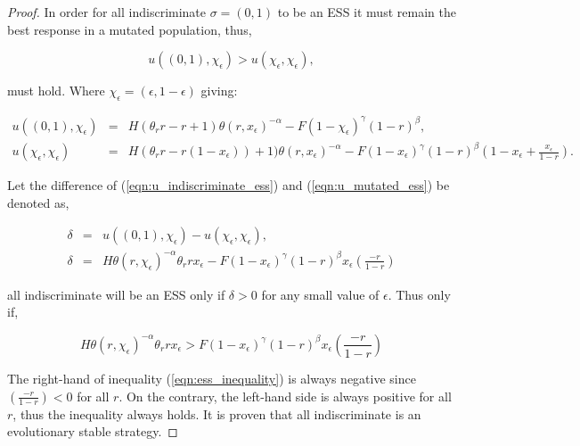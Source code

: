 \documentclass[10pt]{article}
\begin{document}
\begin{proof}
    In order for all indiscriminate \(\sigma=(0,1)\) to be an ESS it must
    remain the best response in a mutated population, thus,

    \begin{equation}\label{eqn:evolutionary_stability}
        u((0, 1), \chi_\epsilon) > u(\chi_\epsilon, \chi_\epsilon),
    \end{equation}

    must hold. Where \(\chi_{\epsilon}=(\epsilon, 1 - \epsilon)\) giving:

    \begin{eqnarray}
        \label{eqn:u_indiscriminate_ess}
        u((0, 1), \chi_\epsilon)  &=& H(\theta_rr - r + 1)\theta(r, x_\epsilon) ^{-\alpha}
        - F(1 - \chi_\epsilon) ^ {\gamma} (1- r) ^ {\beta},
        \\
        \label{eqn:u_mutated_ess}
        u(\chi_\epsilon, \chi_\epsilon) &=& H(\theta_rr - r(1 - x_\epsilon))+ 1)\theta(r,
        x_\epsilon) ^{-\alpha} - F(1 - x_\epsilon) ^ {\gamma} (1- r) ^
        {\beta}\left(1 - 
        x_\epsilon + \frac{x_\epsilon}{1- r}\right).
\end{eqnarray}

    Let the difference of (\ref{eqn:u_indiscriminate_ess}) and (\ref{eqn:u_mutated_ess})
    be denoted as, 

    \begin{eqnarray}
        \label{eqn:delta}
        \delta &=& u((0, 1), \chi_\epsilon) - u(\chi_\epsilon, \chi_\epsilon),
        \\
        \label{eqn:sub_to_delta}
        \delta &=& H\theta(r, \chi_\epsilon) ^{-\alpha} \theta_r r x_\epsilon -
        F(1 - x_\epsilon) ^ {\gamma} (1- r) ^
        {\beta}x_\epsilon\left(\frac{-r}{1- r}\right)
    \end{eqnarray}

    all indiscriminate will be an ESS only if \(\delta >0 \) for any small 
    value of \(\epsilon\). Thus only if,

    \begin{equation}
    \label{eqn:ess_inequality}
        H\theta(r, \chi_\epsilon) ^{-\alpha} \theta_r r x_\epsilon > F
        (1 - x_\epsilon) ^ {\gamma} (1- r) ^ {\beta}
        x_\epsilon\left(\frac{-r}{1- r}\right)
    \end{equation}

    The right-hand of inequality (\ref{eqn:ess_inequality}) is always negative
    since \((\frac{-r}{1- r}) < 0\)  for all \(r\). On the contrary, the left-hand 
    side is always positive for all \(r\), thus the inequality always holds.
    It is proven that all indiscriminate is an evolutionary stable strategy.
\end{proof}
\end{document}

